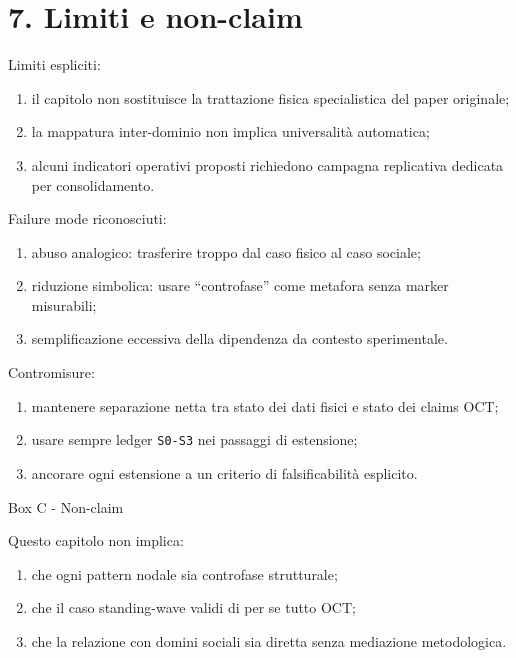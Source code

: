 \section{7. Limiti e non-claim}

Limiti espliciti:

\begin{enumerate}
\def\labelenumi{\arabic{enumi}.}
\tightlist
\item
  il capitolo non sostituisce la trattazione fisica specialistica del paper originale;
\item
  la mappatura inter-dominio non implica universalità automatica;
\item
  alcuni indicatori operativi proposti richiedono campagna replicativa dedicata per consolidamento.
\end{enumerate}

Failure mode riconosciuti:

\begin{enumerate}
\def\labelenumi{\arabic{enumi}.}
\tightlist
\item
  abuso analogico: trasferire troppo dal caso fisico al caso sociale;
\item
  riduzione simbolica: usare ``controfase'' come metafora senza marker misurabili;
\item
  semplificazione eccessiva della dipendenza da contesto sperimentale.
\end{enumerate}

Contromisure:

\begin{enumerate}
\def\labelenumi{\arabic{enumi}.}
\tightlist
\item
  mantenere separazione netta tra stato dei dati fisici e stato dei claims OCT;
\item
  usare sempre ledger \texttt{S0-S3} nei passaggi di estensione;
\item
  ancorare ogni estensione a un criterio di falsificabilità esplicito.
\end{enumerate}

Box C - Non-claim

Questo capitolo non implica:

\begin{enumerate}
\def\labelenumi{\arabic{enumi}.}
\tightlist
\item
  che ogni pattern nodale sia controfase strutturale;
\item
  che il caso standing-wave validi di per se tutto OCT;
\item
  che la relazione con domini sociali sia diretta senza mediazione metodologica.
\end{enumerate}

